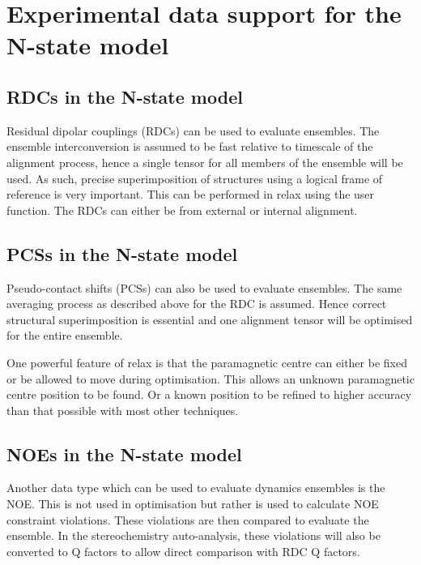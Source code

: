  
\section{Experimental data support for the N-state model}

\subsection{RDCs in the N-state model}

Residual dipolar couplings (RDCs) can be used to evaluate ensembles.  
The ensemble interconversion is assumed to be fast relative to timescale of the alignment process, hence a single tensor for all members of the ensemble will be used.
As such, precise superimposition of structures using a logical frame of reference is very important.
This can be performed in relax using the  user function.
The RDCs can either be from external or internal alignment.


\subsection{PCSs in the N-state model}

Pseudo-contact shifts (PCSs) can also be used to evaluate ensembles.  
The same averaging process as described above for the RDC is assumed.
Hence correct structural superimposition is essential and one alignment tensor will be optimised for the entire ensemble.

One powerful feature of relax is that the paramagnetic centre can either be fixed or be allowed to move during optimisation.
This allows an unknown paramagnetic centre position to be found.
Or a known position to be refined to higher accuracy than that possible with most other techniques.


\subsection{NOEs in the N-state model}

Another data type which can be used to evaluate dynamics ensembles is the NOE.
This is not used in optimisation but rather is used to calculate NOE constraint violations.
These violations are then compared to evaluate the ensemble.
In the stereochemistry auto-analysis, these violations will also be converted to Q factors to allow direct comparison with RDC Q factors.



